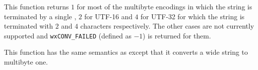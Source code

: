
This function returns $1$ for most of the multibyte encodings in which the
string is terminated by a single \NUL, $2$ for UTF-16 and $4$ for UTF-32 for
which the string is terminated with $2$ and $4$ \NUL characters respectively.
The other cases are not currently supported and \texttt{wxCONV\_FAILED} 
(defined as $-1$) is returned for them.


\label{wxmbconvtowchar}


This function has the same semantics as  
except that it converts a wide string to multibyte one.


